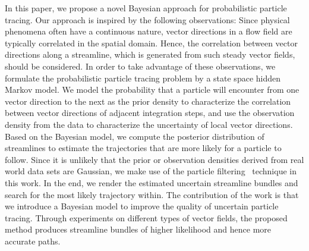 \documentclass{vgtc}                          %
\begin{document}
In this paper, we propose a novel Bayesian approach for probabilistic particle tracing. Our approach is inspired by the following observations: Since physical phenomena often have a continuous nature, vector directions in a flow field are typically correlated in the spatial domain. Hence, the correlation between vector directions along a streamline, which is generated from such steady vector fields, should be considered. In order to take advantage of these observations, we formulate the probabilistic particle tracing problem by a state space hidden Markov model. We model the probability that a particle will encounter from one vector direction to the next as the prior density to characterize the correlation between vector directions of adjacent integration steps, and use the observation density from the data to characterize the uncertainty of local vector directions. Based on the Bayesian model, we compute the posterior distribution of streamlines to estimate the trajectories that are more likely for a particle to follow. Since it is unlikely that the prior or observation densities derived from real world data sets are Gaussian, we make use of the particle filtering~\cite{doucet2001sequential} technique in this work. In the end, we render the estimated uncertain streamline bundles and search for the most likely trajectory within. The contribution of the work is that we introduce a Bayesian model to improve the quality of uncertain particle tracing. Through experiments on different types of vector fields, the proposed method produces streamline bundles of higher likelihood and hence more accurate paths.













\end{document}
